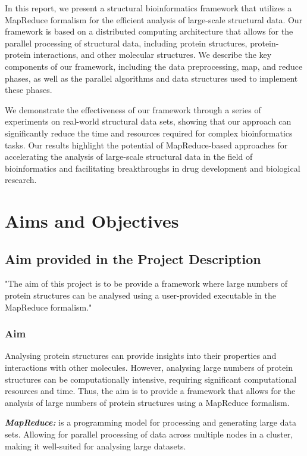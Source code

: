 \documentclass[]{final_report}
\begin{document}
In this report, we present a structural bioinformatics framework that utilizes a MapReduce formalism for the efficient analysis of large-scale structural data. Our framework is based on a distributed computing architecture that allows for the parallel processing of structural data, including protein structures, protein-protein interactions, and other molecular structures. We describe the key components of our framework, including the data preprocessing, map, and reduce phases, as well as the parallel algorithms and data structures used to implement these phases.

We demonstrate the effectiveness of our framework through a series of experiments on real-world structural data sets, showing that our approach can significantly reduce the time and resources required for complex bioinformatics tasks. Our results highlight the potential of MapReduce-based approaches for accelerating the analysis of large-scale structural data in the field of bioinformatics and facilitating breakthroughs in drug development and biological research.
\clearpage

\section{Aims and Objectives}
\subsection{Aim provided in the Project Description}
"The aim of this project is to be provide a framework where large numbers of protein structures can be analysed using a user-provided executable in the MapReduce formalism."

\subsubsection{Aim}
Analysing protein structures can provide insights into their properties and interactions with other molecules. However, analysing large numbers of protein structures can be computationally intensive, requiring significant computational resources and time. Thus, the aim is to provide a framework that allows for the analysis of large numbers of protein structures using a MapReduce formalism.

\textbf{\textit{MapReduce:}} is a programming model for processing and generating large data sets. Allowing for parallel processing of data across multiple nodes in a cluster, making it well-suited for analysing large datasets.
\end{document}

